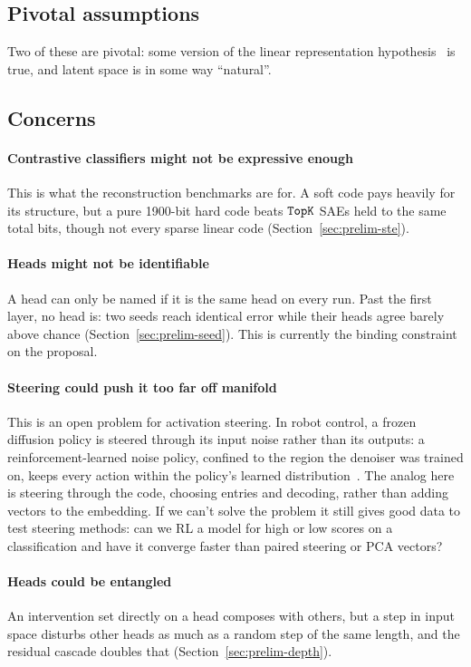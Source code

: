\subsection{Pivotal assumptions}
Two of these are pivotal: some version of the linear representation
hypothesis~\cite{park2023linear,park2025} is true, and latent space is in
some way ``natural''.

\subsection{Concerns}

\paragraph{Contrastive classifiers might not be expressive enough}
This is what the reconstruction benchmarks are for. A soft code pays
heavily for its structure, but a pure 1900-bit hard code beats $\mathop{\mathtt{TopK}}\limits$
SAEs held to the same total bits, though not every sparse linear code
(Section~\ref{sec:prelim-ste}).

\paragraph{Heads might not be identifiable}
A head can only be named if it is the same head on every run. Past the
first layer, no head is: two seeds reach identical error while their
heads agree barely above chance (Section~\ref{sec:prelim-seed}). This is
currently the binding constraint on the proposal.

\paragraph{Steering could push it too far off manifold}
This is an open problem for activation steering. In robot control, a
frozen diffusion policy is steered through its input noise rather than
its outputs: a reinforcement-learned noise policy, confined to the region
the denoiser was trained on, keeps every action within the policy's
learned distribution~\cite{wagenmaker2025}. The analog here is steering
through the code, choosing entries and decoding, rather than adding
vectors to the embedding.
If we can't solve the problem it still gives good data to test steering
methods: can we RL a model for high or low scores on a classification and
have it converge faster than paired steering or PCA vectors?

\paragraph{Heads could be entangled}
An intervention set directly on a head composes with others, but a step
in input space disturbs other heads as much as a random step of the same
length, and the residual cascade doubles that
(Section~\ref{sec:prelim-depth}).

